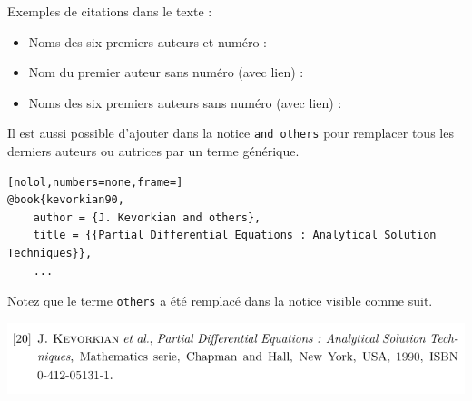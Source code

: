 Exemples de citations dans le texte :

\begin{itemize}
	\item Noms des six premiers auteurs et numéro : \citet*{Essen2012}
	\item Nom du premier auteur sans numéro (avec lien) : \citeauthor{Essen2012}
	\item Noms des six premiers auteurs sans numéro (avec lien) : \citeauthor*{Essen2012}	
\end{itemize}

Il est aussi possible d'ajouter dans la notice \texttt{and others} pour remplacer tous les derniers auteurs ou autrices par un terme générique.

\begin{lstlisting}[nolol,numbers=none,frame=]
@book{kevorkian90,
	author = {J. Kevorkian and others},
	title = {{Partial Differential Equations : Analytical Solution Techniques}},
	...
\end{lstlisting}

Notez que le terme \texttt{others} a été remplacé dans la notice visible comme suit.
\begin{center}
	\includegraphics[width=\linewidth]{"NoticeEtal"}
\end{center}

